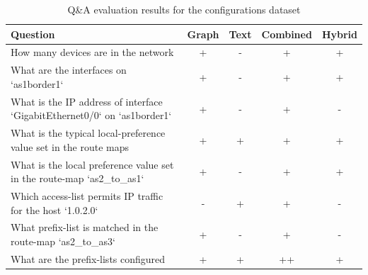 \documentclass[conference]{IEEEtran}
\begin{document}
\begin{table}
\centering
\caption{Q\&A evaluation results for the configurations dataset}
\begin{tabular}{|p{12cm}|c|c|c|c|}
\hline
\textbf{Question} & \textbf{Graph} & \textbf{Text} & \textbf{Combined} & \textbf{Hybrid} \\
\hline
How many devices are in the network & \cellcolor{green!30}+ & \cellcolor{red!30}- & \cellcolor{green!30}+ & \cellcolor{green!30}+ \\
\hline
What are the interfaces on `as1border1` & \cellcolor{green!30}+ & \cellcolor{red!30}- & \cellcolor{green!30}+ & \cellcolor{green!30}+ \\
\hline
What is the IP address of interface `GigabitEthernet0/0` on `as1border1` & \cellcolor{green!30}+ & \cellcolor{red!30}- & \cellcolor{green!30}+ & \cellcolor{red!30}- \\
\hline
What is the typical local-preference value set in the route maps & \cellcolor{green!30}+ & \cellcolor{green!30}+ & \cellcolor{green!30}+ & \cellcolor{green!30}+ \\
\hline
What is the local preference value set in the route-map `as2\_to\_as1` & \cellcolor{green!30}+ & \cellcolor{red!30}- & \cellcolor{green!30}+ & \cellcolor{green!30}+ \\
\hline
Which access-list permits IP traffic for the host `1.0.2.0` & \cellcolor{red!30}- & \cellcolor{green!30}+ & \cellcolor{green!30}+ & \cellcolor{red!30}- \\
\hline
What prefix-list is matched in the route-map `as2\_to\_as3` & \cellcolor{green!30}+ & \cellcolor{red!30}- & \cellcolor{green!30}+ & \cellcolor{red!30}- \\
\hline
What are the prefix-lists configured & \cellcolor{green!30}+ & \cellcolor{green!30}+ & \cellcolor{orange!50}++ & \cellcolor{green!30}+ \\
\hline
\end{tabular}
\label{tab:qa_results_configs}
\end{table}
\end{document}
